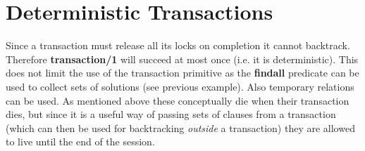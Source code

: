 \section{Deterministic Transactions}

Since a transaction must release all its locks on completion
it cannot backtrack.  Therefore {\bf transaction/1} will
succeed at most once (i.e. it is deterministic).
This does not limit the use of the transaction primitive
as the {\bf findall} predicate can be used to collect
sets of solutions (see previous example).
Also temporary relations can be used.  As mentioned
above these conceptually die when their transaction dies,
but since it is a useful way of passing sets of clauses
from a transaction (which can then be used for backtracking
{\em outside} a transaction) they are allowed to live until
the end of the session.

